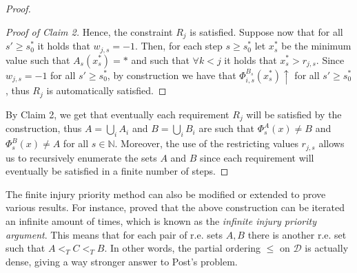 \documentclass[12pt,a4paper]{article}
\theoremstyle{definition}
\newcommand{\N}{\mathbb{N}}                     %
\begin{document}
\begin{proof}
\begin{proof}[Proof of Claim 2]
            Hence, the constraint $R_j$ is satisfied. Suppose now that for all $s' \geq s_0^*$ it holds that $w_{j,s} = -1$. Then, for each step $s \geq s_0^*$ let $x^*_s$ be the minimum value such that $A_s(x^*_s) = *$ and such that $\forall k < j$ it holds that $x^*_s > r_{j,s}$. Since $w_{j,s} = -1$ for all $s' \geq s_0^*$, by construction we have that $\Phi_{i,s}^{B_s}(x^*_s) \uparrow$ for all $s' \geq s_0^*$, thus $R_j$ is automatically satisfied. 
        \end{proof}

        By Claim 2, we get that eventually each requirement $R_j$ will be satisfied by the construction, thus $A = \bigcup_{i} A_i$ and $B = \bigcup_{i} B_i$ are such that $\Phi_s^A(x) \neq B$ and $\Phi_s^B(x) \neq A$ for all $s \in \N$. Moreover, the use of the restricting values $r_{j,s}$ allows us to recursively enumerate the sets $A$ and $B$ since each requirement will eventually be satisfied in a finite number of steps.

    \end{proof}

    The finite injury priority method can also be modified or extended to prove various results. For instance, \textcite{sacks} proved that the above construction can be iterated an infinite amount of times, which is known as the \textit{infinite injury priority argument}. This means that for each pair of r.e. sets $A,B$ there is another r.e. set such that $A <_T C <_T B$. In other words, the partial ordering $\leq$ on $\mathcal{D}$ is actually dense, giving a way stronger answer to Post's problem.

    \newpage
    \printbibliography
\end{document}
